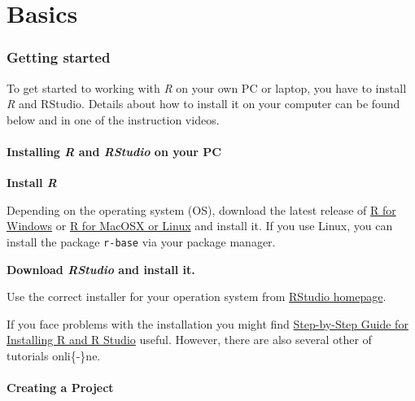 \documentclass[
]{scrartcl}
\makeatletter
\newenvironment{kframe}{%
\medskip{}
\setlength{\fboxsep}{.8em}
 \def\at@end@of@kframe{}%
 \ifinner\ifhmode%
  \def\at@end@of@kframe{\end{minipage}}%
  \begin{minipage}{\columnwidth}%
 \fi\fi%
 \def\FrameCommand##1{\hskip\@totalleftmargin \hskip-\fboxsep
 \colorbox{shadecolor}{##1}\hskip-\fboxsep
     \hskip-\linewidth \hskip-\@totalleftmargin \hskip\columnwidth}%
 \MakeFramed {\advance\hsize-\width
   \@totalleftmargin\z@ \linewidth\hsize
   \@setminipage}}%
 {\par\unskip\endMakeFramed%
 \at@end@of@kframe}
\newenvironment{rmdblock}[1]
  {
  \begin{itemize}
  \renewcommand{\labelitemi}{
    \raisebox{-.7\height}[0pt][0pt]{
      {\setkeys{Gin}{width=3em,keepaspectratio}\texttt{[image: images/\#1]}}
    }
  }
  \setlength{\fboxsep}{1em}
  \begin{kframe}
  \item
  }
  {
  \end{kframe}
  \end{itemize}
  }
\newenvironment{myexercise}
    {\begin{rmdblock}{exercise_green}}
    {\end{rmdblock}}
\makeatother
\begin{document}
\newpage

\hypertarget{part-basics}{%
\part{Basics}\label{part-basics}}

\hypertarget{gettingstarted}{%
\section{Getting started}\label{gettingstarted}}

To get started to working with \emph{R} on your own PC or laptop, you have to install \emph{R} and RStudio. Details about how to install it on your computer can be found below and in one of the instruction videos.

\hypertarget{installing-r-and-rstudio-on-your-pc}{%
\subsection{\texorpdfstring{Installing \emph{R} and \emph{RStudio} on your PC}{Installing R and RStudio on your PC}}\label{installing-r-and-rstudio-on-your-pc}}

\begin{myexercise}
\textbf{Install \emph{R}}

Depending on the operating system (OS), download the latest release of
\href{https://cran.rstudio.com/bin/windows/base/}{R for Windows} or
\href{https://cran.rstudio.com/}{R for MacOSX or Linux} and install it.
If you use Linux, you can install the package \texttt{r-base} via your
package manager.
\end{myexercise}

\begin{myexercise}
\textbf{Download \emph{RStudio} and install it.}

Use the correct installer for your operation system from
\href{https://rstudio.com/products/rstudio/download/\#download}{RStudio
homepage}.
\end{myexercise}

If you face problems with the installation you might find \href{https://techvidvan.com/tutorials/install-r/}{Step-by-Step Guide for Installing R and R Studio} useful. However, there are also several other of tutorials onli\{-\}ne.

\hypertarget{creating-a-project}{%
\subsection{Creating a Project}\label{creating-a-project}}
\end{document}
